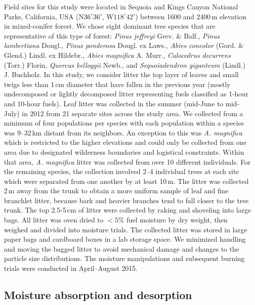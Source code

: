 \documentclass[letterpaper,12pt]{article}
\begin{document}
Field sites for this study were located in Sequoia and Kings Canyon National
Parks, California, USA (N$36^\circ 36'$, W$118^\circ 42'$) between 1600 and
2400\,m elevation in mixed-conifer forest. We chose eight dominant tree species
that are representative of this type of forest: \emph{Pinus jeffreyi} Grev. \&
Balf., \emph{Pinus lambertiana} Dougl., \emph{Pinus ponderosa} Dougl. ex Laws.,
\emph{Abies concolor} (Gord. \& Glend.) Lindl. ex Hildebr., \emph{Abies
  magnifica} A. Murr., \emph{Calocedrus decurrens} (Torr.) Florin,
\emph{Quercus kelloggii} Newb., and \emph{Sequoiadendron giganteum} (Lindl.) J.
Buchholz. In this study, we consider litter the top layer of leaves and small
twigs less than 1\,cm diameter that have fallen in the previous year (mostly
undecomposed or lightly decomposed litter representing fuels classified as
1-hour and 10-hour fuels). Leaf litter was collected in the summer (mid-June to
mid-July) in 2012 from 21 separate sites across the study area. We collected
from a minimum of four populations per species with each population within a
species was 9--32\,km distant from its neighbors. An exception to this was
\emph{A. magnifica} which is restricted to the higher elevations and could only
be collected from one area due to designated wilderness boundaries and
logistical constraints. Within that area, \emph{A. magnifica} litter was
collected from over 10 different individuals. For the remaining species, the
collection involved 2--4 individual trees at each site which were separated
from one another by at least 10\,m. The litter was collected 2\,m away from the
trunk to obtain a more uniform sample of leaf and fine branchlet litter,
because bark and heavier branches tend to fall closer to the tree trunk. The
top 2.5-5\,cm of litter were collected by raking and shoveling into large bags.
All litter was oven dried to $< 5$\% fuel moisture by dry weight, then weighed
and divided into moisture trials. The collected litter was stored in large
paper bags and cardboard boxes in a lab storage space. We minimized handling
and moving the bagged litter to avoid mechanical damage and changes to the
particle size distributions. The moisture manipulations and subsequent burning
trials were conducted in April--August 2015.

\subsection*{Moisture absorption and desorption}
\end{document}
